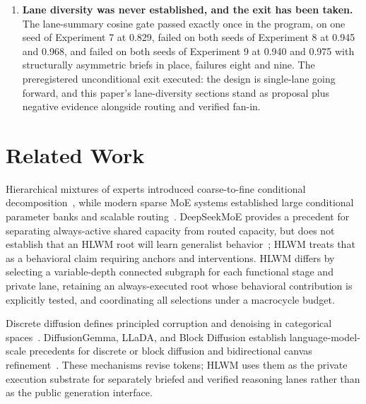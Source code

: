 \documentclass[10pt,a4paper]{article}
\begin{document}
\begin{enumerate}[label=\arabic*.]
  targeted initialization fix eliminated the degeneration but not the routing
  collapse, which reproduced on the same seed under a different
  initialization. Experiment 7 reproduced it a third time at two experts, and
  Experiment 8 showed the same seed-dependence in a mechanism with no experts at
  all, since the two seeds' publish rules landed at coverage 0.172 and 0.078
  from identical training. Experiment 9's two seeds then agreed almost exactly,
  sharing six of their seven failed gates, so the variance appears to
  concentrate in mechanisms operating near their noise floor rather than in
  the training loop as such. Multi-seed evaluation remains mandatory for
  every claim.
\item \textbf{Lane diversity was never established, and the exit has been
  taken.} The lane-summary cosine gate passed exactly once in the program, on
  one seed of Experiment 7 at 0.829, failed on both seeds of Experiment 8 at 0.945 and
  0.968, and failed on both seeds of Experiment 9 at 0.940 and 0.975 with
  structurally asymmetric briefs in place, failures eight and nine. The
  preregistered unconditional exit executed: the design is single-lane going
  forward, and this paper's lane-diversity sections stand as proposal plus
  negative evidence alongside routing and verified fan-in.
\end{enumerate}

\section{Related Work}
\label{sec:prior}

Hierarchical mixtures of experts introduced coarse-to-fine conditional
decomposition~\cite{jordan1994}, while modern sparse MoE systems established
large conditional parameter banks and scalable
routing~\cite{lepikhin2021,fedus2022,shazeer2017}. DeepSeekMoE provides a
precedent for separating always-active shared capacity from routed capacity,
but does not establish that an HLWM root will learn generalist
behavior~\cite{dai2024}; HLWM treats that as a behavioral claim requiring
anchors and interventions. HLWM differs by selecting a variable-depth
connected subgraph for each functional stage and private lane, retaining an
always-executed root whose behavioral contribution is explicitly tested, and
coordinating all selections under a macrocycle budget.

Discrete diffusion defines principled corruption and denoising in categorical
spaces~\cite{austin2021}. DiffusionGemma, LLaDA, and Block Diffusion
establish language-model-scale precedents for discrete or block diffusion and
bidirectional canvas refinement~\cite{diffusiongemma,nie2025,arriola2025}.
These mechanisms revise tokens; HLWM uses them as the private execution
substrate for separately briefed and verified reasoning lanes rather than as
the public generation interface.
\end{document}
